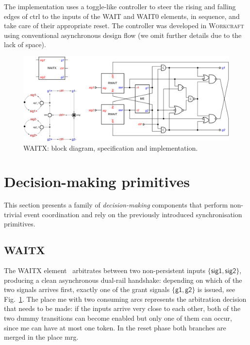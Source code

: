 \documentclass[conference]{IEEEtran}
\begin{document}
The implementation uses a toggle-like controller to steer the
rising and falling edges of \textsf{ctrl} to the inputs of the \textsf{WAIT} and
\textsf{WAIT0} elements, in sequence, and take care of their appropriate
reset. The controller was developed in \textsc{Workcraft}~\cite{Workcraft_website}
using conventional asynchronous design flow (we omit further
details due to the lack of space).

\begin{figure}
\begin{center}
    \includegraphics[scale=0.23]{fig/WAITX.pdf}
    \vspace{-3mm}
    \caption{\textsf{WAITX}: block diagram, specification and implementation.}
    \label{fig:waitx}
    \vspace{-7mm}
\end{center}
\end{figure}

\section{Decision-making primitives}\label{sec-decision}

This section presents a family of \emph{decision-making} components that perform
non-trivial event coordination and rely on the previously introduced synchronisation
primitives.

\subsection*{\textsf{WAITX}}

The \textsf{WAITX} element~\cite{2017_khomenko_waitx} arbitrates between two
non-persistent inputs $\{\textsf{sig1}, \textsf{sig2}\}$, producing a clean
asynchronous dual-rail handshake: depending on which of the two signals arrives
first, exactly one of the grant signals $\{\textsf{g1}, \textsf{g2}\}$ is issued, see
Fig.~\ref{fig:waitx}. The place \textsf{me} with two consuming arcs represents
the arbitration decision that needs to be made: if the inputs arrive very close to
each other, both of the two dummy transitions can become enabled but only one
of them can occur, since \textsf{me} can have at most one token. In the reset phase
both branches are merged in the place \textsf{mrg}.
\end{document}

